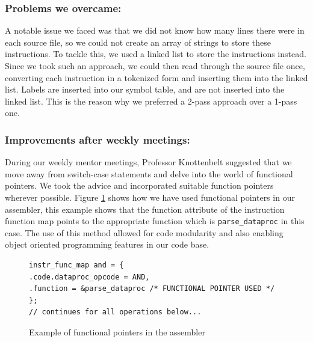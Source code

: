 \documentclass[a4paper]{article}
\begin{document}
\subsubsection{Problems we overcame: }
A notable issue we faced was that we did not know how many lines there were in each source file, so we could not create an array of strings to store these instructions. To tackle this, we used a linked list to store the instructions instead. Since we took such an approach, we could then read through the source file once, converting each instruction in a tokenized form and inserting them into the linked list. Labels are inserted into our symbol table, and are not inserted into the linked list. This is the reason why we preferred a 2-pass approach over a 1-pass one.

\subsubsection{Improvements after weekly meetings: }
During our weekly mentor meetings, Professor Knottenbelt suggested that we move away from switch-case statements and delve into the world of functional pointers. We took the advice and incorporated suitable function pointers wherever possible. Figure \ref{fig:functional_pointers} shows how we have used functional pointers in our assembler, this example shows that the function attribute of the instruction function map points to the appropriate function which is \verb|parse_dataproc| in this case. The use of this method allowed for code modularity and also enabling object oriented programming features in our code base.

\begin{figure}[htp]
\centering
\begin{BVerbatim}
instr_func_map and = {
.code.dataproc_opcode = AND,
.function = &parse_dataproc /* FUNCTIONAL POINTER USED */
};
// continues for all operations below...
\end{BVerbatim}
\caption{Example of functional pointers in the assembler}
\label{fig:functional_pointers}
\end{figure}
\end{document}
